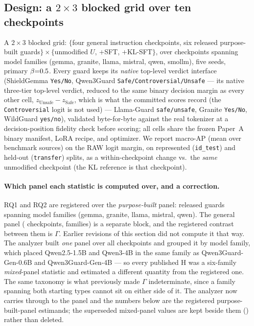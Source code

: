 \subsection{Design: a \texorpdfstring{$2\times3$}{2x3} blocked grid over ten checkpoints}
\label{sec:adaptation-design}
\noindent A $2\times 3$ blocked grid: $\{$four general instruction checkpoints, six released
purpose-built guards$\}\times\{$unmodified $U$, $+$SFT, $+$KL-SFT$\}$, over \AdaNCheckpoints{}
checkpoints spanning \AdaNFamilies{} model families (gemma, granite, llama, mistral, qwen, smollm), five
seeds, primary $\beta{=}0.5$. Every guard keeps its \emph{native} top-level verdict
interface (ShieldGemma \texttt{Yes/No}, Qwen3Guard \texttt{Safe/Controversial/Unsafe} --- its native
three-tier top-level verdict, reduced to the same binary decision margin as every other cell,
$z_{\text{Unsafe}}-z_{\text{Safe}}$, which is what the committed scores record (the
\texttt{Controversial} logit is not used) --- Llama-Guard
\texttt{safe/unsafe}, Granite \texttt{Yes/No}, WildGuard \texttt{yes/no}), validated byte-for-byte
against the real tokenizer at a decision-position fidelity check before scoring; all cells share the
frozen Paper~A binary manifest, LoRA recipe, and optimizer. We report macro-AP (mean over benchmark
sources) on the RAW logit margin, on represented (\texttt{id\_test}) and held-out (\texttt{transfer})
splits, as a within-checkpoint change vs.\ the \emph{same} unmodified checkpoint (the KL reference is
that checkpoint).

\paragraph{Which panel each statistic is computed over, and a correction.} RQ1 and RQ2 are registered
over the \emph{purpose-built} panel: \AdaNCheckpointsPB{} released guards spanning
\AdaNFamiliesPB{} model families (gemma, granite, llama, mistral, qwen). The general panel
(\AdaNCheckpointsGen{} checkpoints, \AdaNFamiliesGen{} families) is a separate block, and the
registered contrast between them is $\Gamma$. Earlier revisions of this section did not compute it that
way. The analyzer built \emph{one} panel over all \AdaNCheckpoints{} checkpoints and grouped it by model
family, which placed Qwen2.5-1.5B and Qwen3-4B in the same  family as Qwen3Guard-Gen-0.6B and
Qwen3Guard-Gen-4B --- so every published H was a six-family \emph{mixed}-panel statistic and estimated a
different quantity from the registered one. The same taxonomy is what previously made $\Gamma$
indeterminate, since a family spanning both starting types cannot sit on either side of it. The
analyzer now carries  through to the panel and the numbers below are the registered
purpose-built-panel estimands; the superseded mixed-panel values are kept beside them
() rather than deleted.

